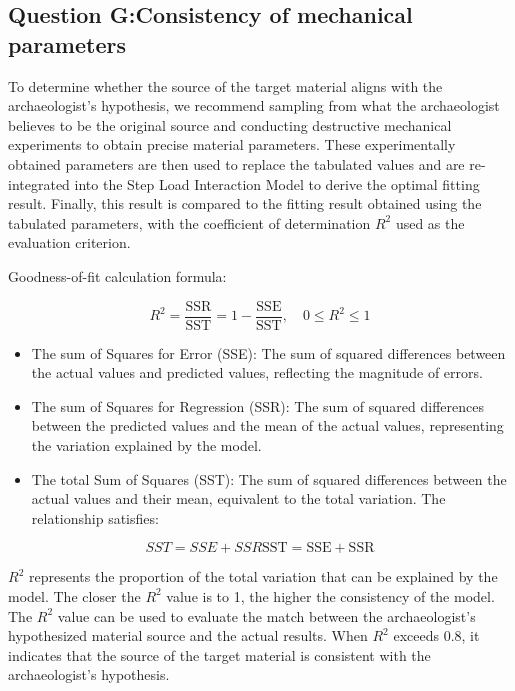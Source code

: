 \documentclass{mcmthesis}
\begin{document}
\subsection{Question G:Consistency of mechanical parameters}

To determine whether the source of the target material aligns with the archaeologist's hypothesis, we recommend sampling from what the archaeologist believes to be the original source and conducting destructive mechanical experiments to obtain precise material parameters. These experimentally obtained parameters are then used to replace the tabulated values and are re-integrated into the Step Load Interaction Model to derive the optimal fitting result. Finally, this result is compared to the fitting result obtained using the tabulated parameters, with the coefficient of determination $R^2$ used as the evaluation criterion.


Goodness-of-fit calculation formula:


\[R^2 = \frac{\text{SSR}}{\text{SST}} = 1 - \frac{\text{SSE}}{\text{SST}}, \quad 0 \leq R^2 \leq 1 \]

\begin{itemize} 

\item The sum of Squares for Error (SSE): The sum of squared differences between the actual values and predicted values, reflecting the magnitude of errors. 

\item The sum of Squares for Regression (SSR): The sum of squared differences between the predicted values and the mean of the actual values, representing the variation explained by the model. 

\item The total Sum of Squares (SST): The sum of squared differences between the actual values and their mean, equivalent to the total variation. The relationship satisfies: 
\end{itemize}



\[SST=SSE+SSR\text{SST} = \text{SSE} + \text{SSR}\]

$R^2$ represents the proportion of the total variation that can be explained by the model. The closer the $R^2$ value is to 1, the higher the consistency of the model. The $R^2$ value can be used to evaluate the match between the archaeologist's hypothesized material source and the actual results. When $R^2$ exceeds 0.8, it indicates that the source of the target material is consistent with the archaeologist's hypothesis.
\end{document}
